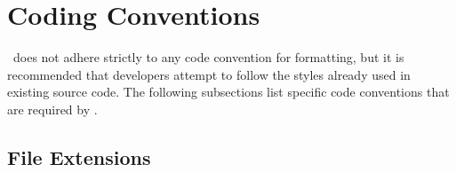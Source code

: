 
\section{Coding Conventions}
\label{sec:codeconventions} 

\draco\ does not adhere strictly to any code convention for formatting, but it is recommended that developers attempt to follow the styles already used in existing source code.  The following subsections list specific code conventions that are required by \draco.

\subsection{File Extensions}
\label{sec:cc-fileext}

